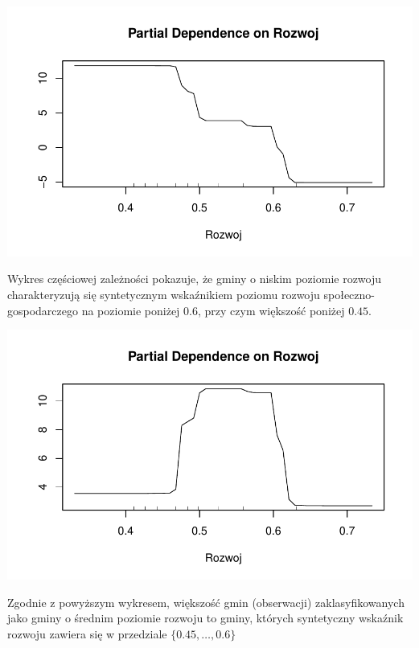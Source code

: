 \documentclass{amuthesis}
\begin{document}
\begin{center}\includegraphics[width=0.9\linewidth]{figures/unnamed-chunk-24-1} \end{center}

Wykres częściowej zależności pokazuje, że gminy o niskim poziomie rozwoju charakteryzują się syntetycznym wskaźnikiem poziomu rozwoju społeczno-gospodarczego na poziomie poniżej \(0.6\), przy czym większość poniżej \(0.45\).

\begin{Shaded}
\begin{Highlighting}[]
\SpecialCharTok{::}
    \NormalTok{)}
\end{Highlighting}
\end{Shaded}

\begin{center}\includegraphics[width=0.9\linewidth]{figures/unnamed-chunk-25-1} \end{center}

Zgodnie z powyższym wykresem, większość gmin (obserwacji) zaklasyfikowanych jako gminy o średnim poziomie rozwoju to gminy, których syntetyczny wskaźnik rozwoju zawiera się w przedziale \(\{0.45,\dots, 0.6\}\)
\end{document}
